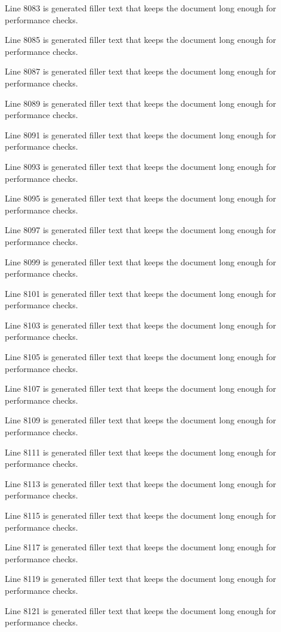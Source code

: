 Line 8083 is generated filler text that keeps the document long enough for performance checks.

Line 8085 is generated filler text that keeps the document long enough for performance checks.

Line 8087 is generated filler text that keeps the document long enough for performance checks.

Line 8089 is generated filler text that keeps the document long enough for performance checks.

Line 8091 is generated filler text that keeps the document long enough for performance checks.

Line 8093 is generated filler text that keeps the document long enough for performance checks.

Line 8095 is generated filler text that keeps the document long enough for performance checks.

Line 8097 is generated filler text that keeps the document long enough for performance checks.

Line 8099 is generated filler text that keeps the document long enough for performance checks.

Line 8101 is generated filler text that keeps the document long enough for performance checks.

Line 8103 is generated filler text that keeps the document long enough for performance checks.

Line 8105 is generated filler text that keeps the document long enough for performance checks.

Line 8107 is generated filler text that keeps the document long enough for performance checks.

Line 8109 is generated filler text that keeps the document long enough for performance checks.

Line 8111 is generated filler text that keeps the document long enough for performance checks.

Line 8113 is generated filler text that keeps the document long enough for performance checks.

Line 8115 is generated filler text that keeps the document long enough for performance checks.

Line 8117 is generated filler text that keeps the document long enough for performance checks.

Line 8119 is generated filler text that keeps the document long enough for performance checks.

Line 8121 is generated filler text that keeps the document long enough for performance checks.

